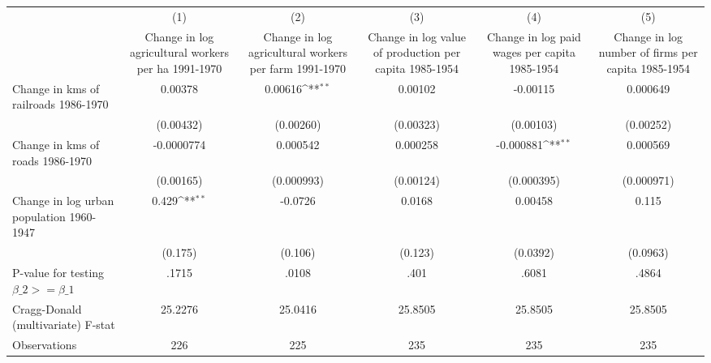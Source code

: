 {
\def\sym#1{\ifmmode^{#1}\else\(^{#1}\)\fi}
\begin{tabular}{l*{5}{c}}
\hline\hline
                &\multicolumn{1}{c}{(1)}&\multicolumn{1}{c}{(2)}&\multicolumn{1}{c}{(3)}&\multicolumn{1}{c}{(4)}&\multicolumn{1}{c}{(5)}\\
                &\multicolumn{1}{c}{Change in log agricultural workers per ha 1991-1970}&\multicolumn{1}{c}{Change in log agricultural workers per farm 1991-1970}&\multicolumn{1}{c}{Change in log value of production per capita 1985-1954}&\multicolumn{1}{c}{Change in log paid wages per capita 1985-1954}&\multicolumn{1}{c}{Change in log number of firms per capita 1985-1954}\\
\hline
Change in kms of railroads 1986-1970&  0.00378         &  0.00616\sym{**} &  0.00102         & -0.00115         & 0.000649         \\
                &(0.00432)         &(0.00260)         &(0.00323)         &(0.00103)         &(0.00252)         \\
[1em]
Change in kms of roads 1986-1970&-0.0000774         & 0.000542         & 0.000258         &-0.000881\sym{**} & 0.000569         \\
                &(0.00165)         &(0.000993)         &(0.00124)         &(0.000395)         &(0.000971)         \\
[1em]
Change in log urban population 1960-1947&    0.429\sym{**} &  -0.0726         &   0.0168         &  0.00458         &    0.115         \\
                &  (0.175)         &  (0.106)         &  (0.123)         & (0.0392)         & (0.0963)         \\
\hline
P-value for testing $\beta\_{2} >= \beta\_{1}$&    .1715         &    .0108         &     .401         &    .6081         &    .4864         \\
Cragg-Donald (multivariate) F-stat&  25.2276         &  25.0416         &  25.8505         &  25.8505         &  25.8505         \\
Observations    &      226         &      225         &      235         &      235         &      235         \\
\hline\hline
\end{tabular}
}
